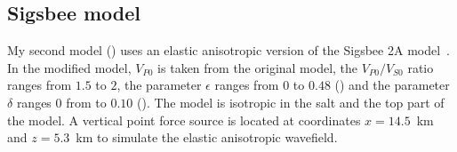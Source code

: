 







\subsection{Sigsbee model}
My second model () uses an
elastic anisotropic version of the Sigsbee 2A
model~\cite[]{SEG-2002-21222125}. In the modified model, $V_{P0}$ 
is taken from the original model, the $V_{P0}/V_{S0}$ ratio ranges
from $1.5$ to $2$, the parameter $\epsilon$ ranges from $0$ to $0.48$
() and the parameter $\delta$ ranges $0$ from to
$0.10$ (). The model is isotropic in the salt and
the top part of the model. A vertical point force source is located at
coordinates $x=14.5$~km and $z=5.3$~km to simulate the elastic
anisotropic wavefield.


